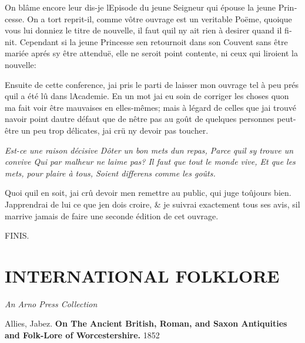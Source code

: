 \documentclass[14pt,a4paper]{memoir}
\begin{document}
\begin{otherlanguage}{french}
On blâme encore leur dis-je l\textquotesingle Episode du jeune Seigneur
qui épouse la jeune Princesse. On a tort reprit-il, comme vôtre ouvrage
est un veritable Poëme, quoique vous lui donniez le titre de nouvelle,
il faut qu\textquotesingle il n\textquotesingle y ait rien à desirer
quand il finit. Cependant si la jeune Princesse s\textquotesingle en
retournoit dans son Couvent sans être mariée aprés s\textquotesingle y
être attenduë, elle ne seroit point contente, ni ceux qui liroient la
nouvelle:

Ensuite de cette conference, j\textquotesingle ai pris le parti de
laisser mon ouvrage tel à peu prés qu\textquotesingle il a été lû dans
l\textquotesingle Academie. En un mot j\textquotesingle ai eu soin de
corriger les choses qu\textquotesingle on m\textquotesingle a fait voir
être mauvaises en elles-mêmes; mais à l\textquotesingle égard de celles
que j\textquotesingle ai trouvé n\textquotesingle avoir point
d\textquotesingle autre défaut que de n\textquotesingle être pas au goût
de quelques personnes peut-être un peu trop délicates,
j\textquotesingle ai crü n\textquotesingle y devoir pas toucher.

\emph{{Est-ce une raison décisive} {D\textquotesingle ôter un bon mets
d\textquotesingle un repas,} {Parce qu\textquotesingle il
s\textquotesingle y trouve un convive} {Qui par malheur ne
l\textquotesingle aime pas?} {Il faut que tout le monde vive,} {Et que
les mets, pour plaire à tous,} {Soient differens comme les goûts.}}

Quoi qu\textquotesingle il en soit, j\textquotesingle ai crû devoir
m\textquotesingle en remettre au public, qui juge toûjours bien.
J\textquotesingle apprendrai de lui ce que j\textquotesingle en dois
croire, \& je suivrai exactement tous ses avis, s\textquotesingle il
m\textquotesingle arrive jamais de faire une seconde édition de cet
ouvrage.

FINIS.

\end{otherlanguage}

\hypertarget{4533318093929944247_33931-h-2.htm.xhtmlux5cux23pgepubid00034}{%
\chapter{INTERNATIONAL
FOLKLORE}\label{4533318093929944247_33931-h-2.htm.xhtmlux5cux23pgepubid00034}}

\emph{An Arno Press Collection}

Allies, Jabez. \textbf{On The Ancient British, Roman, and Saxon
Antiquities and Folk-Lore of Worcestershire.} 1852
\end{document}
